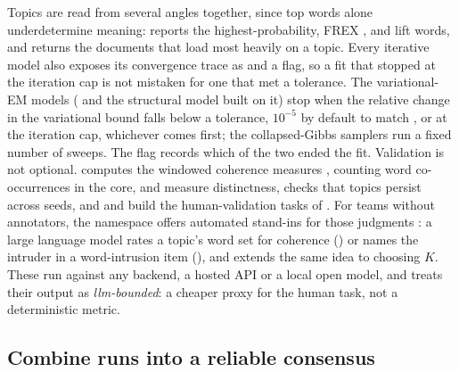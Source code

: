 \documentclass[article]{jss}
\begin{document}
Topics are read from several angles together, since top words alone underdetermine
meaning:  reports the highest-probability, FREX
\citep{bischof2012frex}, and lift words, and  returns the
documents that load most heavily on a topic. Every iterative model also exposes
its convergence trace as  and a  flag, so a fit
that stopped at the iteration cap is not mistaken for one that met a tolerance.
The variational-EM models ( and the structural model built on it) stop
when the relative change in the variational bound falls below a tolerance,
\(10^{-5}\) by default to match  , or at the iteration cap,
whichever comes first; the collapsed-Gibbs samplers run a fixed number of sweeps.
The  flag records which of the two ended the fit.
Validation is not optional.
 computes the windowed coherence measures
\citep{lau2014coherence}, counting word co-occurrences in the core,
 and
 measure distinctness, 
checks that topics persist across seeds, and  and
 build the human-validation tasks of
\citet{chang2009reading}. For teams without annotators, the 
namespace offers automated stand-ins for those judgments \citep{stammbach2023llmeval}:
a large language model rates a topic's word set for coherence
() or names the intruder in a word-intrusion item
(), and  extends the same
idea to choosing $K$. These run against any backend, a hosted API or a local open
model, and  treats their output as \emph{llm-bounded}: a cheaper proxy
for the human task, not a deterministic metric.

\subsection{Combine runs into a reliable consensus}\label{sec:ensemble}
\end{document}
